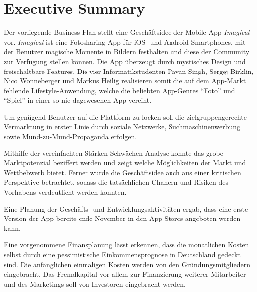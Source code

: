 \chapter{Executive Summary}

Der vorliegende Business-Plan stellt eine Geschäftsidee der Mobile-App \textit{Imagical} vor.
\textit{Imagical} ist eine Fotosharing-App für iOS- und Android-Smartphones, mit der Benutzer magische Momente in Bildern festhalten und diese der Community zur Verfügung stellen können. 
Die App überzeugt durch mystisches Design und freischaltbare Features.
Die vier Informatikstudenten Pavan Singh, Sergej Birklin, Nico Wonneberger und Markus Heilig realisieren somit die auf dem App-Markt fehlende Lifestyle-Anwendung, welche die beliebten App-Genres ``Foto'' und ``Spiel'' in einer so nie dagewesenen App vereint.

Um genügend Benutzer auf die Plattform zu locken soll die zielgruppengerechte Vermarktung in erster Linie durch soziale Netzwerke, Suchmaschinenwerbung sowie Mund-zu-Mund-Propaganda erfolgen.

Mithilfe der vereinfachten Stärken-Schwächen-Analyse konnte das grobe Marktpotenzial beziffert werden und zeigt welche Möglichkeiten der Markt und Wettbebwerb bietet. Ferner wurde die Geschäftsidee auch aus einer kritischen Perspektive betrachtet, sodass die tatsächlichen Chancen und Risiken des Vorhabens verdeutlicht werden konnten.


Eine Planung der Geschäfts- und Entwicklungsaktivitäten ergab, dass eine erste Version der App bereits ende November in den App-Stores angeboten werden kann.

Eine vorgenommene Finanzplanung lässt erkennen, dass die monatlichen Kosten selbst durch eine pessimistische Einkommensprognose in Deutschland gedeckt sind. Die anfänglichen einmaligen Kosten werden von den Gründungsmitgliedern eingebracht. Das Fremdkapital vor allem zur Finanzierung weiterer Mitarbeiter und des Marketings soll von Investoren eingebracht werden.
